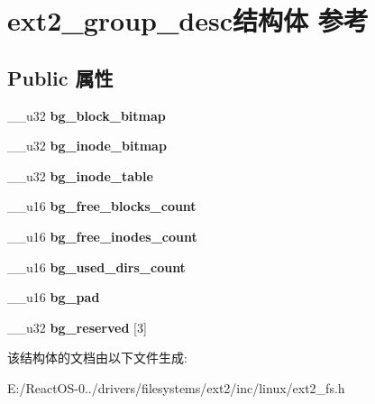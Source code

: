 \hypertarget{structext2__group__desc}{}\section{ext2\+\_\+group\+\_\+desc结构体 参考}
\label{structext2__group__desc}
\subsection*{Public 属性}
\begin{DoxyCompactItemize}
\item 
\mbox{\label{structext2__group__desc_a31039a625aeae7d13c77494ae23c5ccd}} 
\+\_\+\+\_\+u32 {\bfseries bg\+\_\+block\+\_\+bitmap}
\item 
\mbox{\label{structext2__group__desc_a5fba46c83c618d9f182ecd8048de7411}} 
\+\_\+\+\_\+u32 {\bfseries bg\+\_\+inode\+\_\+bitmap}
\item 
\mbox{\label{structext2__group__desc_ad224a4d55acfb7f2301dff74097844dc}} 
\+\_\+\+\_\+u32 {\bfseries bg\+\_\+inode\+\_\+table}
\item 
\mbox{\label{structext2__group__desc_aa2399d4ce6d7aef6f55bbc6a7003697f}} 
\+\_\+\+\_\+u16 {\bfseries bg\+\_\+free\+\_\+blocks\+\_\+count}
\item 
\mbox{\label{structext2__group__desc_af23adb9d093a697494ec35a96041bfe7}} 
\+\_\+\+\_\+u16 {\bfseries bg\+\_\+free\+\_\+inodes\+\_\+count}
\item 
\mbox{\label{structext2__group__desc_aa1f4cff66ed3781c2adc809470c225f2}} 
\+\_\+\+\_\+u16 {\bfseries bg\+\_\+used\+\_\+dirs\+\_\+count}
\item 
\mbox{\label{structext2__group__desc_aac3c2818672424e9d0341ae9ddea1c3e}} 
\+\_\+\+\_\+u16 {\bfseries bg\+\_\+pad}
\item 
\mbox{\label{structext2__group__desc_a7797a6fea190b9d7bf9ad0ac7f16263b}} 
\+\_\+\+\_\+u32 {\bfseries bg\+\_\+reserved} \mbox{[}3\mbox{]}
\end{DoxyCompactItemize}


该结构体的文档由以下文件生成\+:\begin{DoxyCompactItemize}
\item 
E\+:/\+React\+O\+S-\/0../drivers/filesystems/ext2/inc/linux/ext2\+\_\+fs.\+h\end{DoxyCompactItemize}
